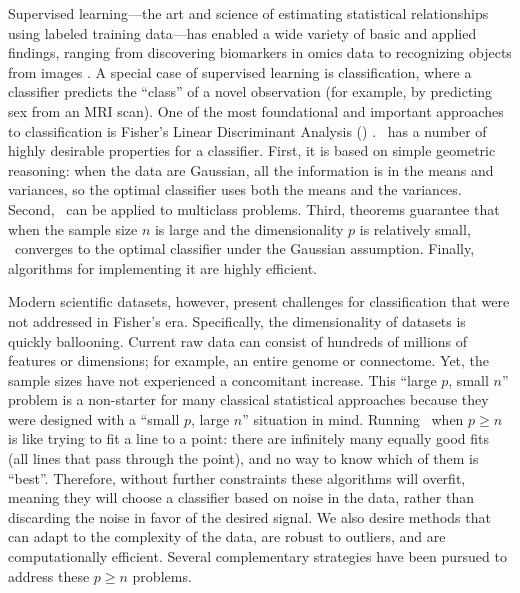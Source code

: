 \documentclass[11pt]{extarticle}
\begin{document}
Supervised learning---the art and science of estimating statistical relationships using labeled training data---has  enabled a wide variety of basic and applied findings, ranging from discovering biomarkers in omics data \cite{Vogelstein2014a} to  recognizing objects from images \cite{Krizhevsky2012}.
A special case of supervised learning is classification, where a classifier predicts the ``class'' of a novel observation (for example, by predicting sex from an MRI scan). One of the most foundational and important approaches to classification is Fisher's Linear Discriminant Analysis (\Lda) \cite{Fisher1925a}.
\Lda~has a number of highly desirable properties for a  classifier.
First, it is based on  simple geometric reasoning: when the data are Gaussian, all the information is in the means and variances, so the optimal classifier uses both the means and the variances.
Second,  \Lda~can be applied to multiclass problems.
Third, theorems guarantee that when the sample size $n$ is large and the dimensionality $p$ is relatively small, \Lda~converges to the optimal classifier under the Gaussian assumption.
Finally,  algorithms for implementing it are highly efficient.


Modern scientific datasets, however, present challenges for classification that were not addressed in Fisher's era.
Specifically, the dimensionality of datasets is quickly ballooning.
Current raw data can consist of hundreds of millions  of features or dimensions; for example, an entire genome or connectome.  Yet, the sample sizes have not experienced a concomitant increase.
This ``large $p$, small $n$'' problem is a non-starter
for many classical statistical approaches because they were designed with a ``small $p$, large $n$'' situation in mind.
Running \Lda~when $p \ge n$  is like trying to fit a line to a point: there are infinitely many equally good fits (all lines that pass through the point), and no way to know which of them is ``best''.
Therefore, without further constraints these algorithms will overfit, meaning they will choose a classifier based on noise in the data, rather than discarding the noise in favor of the desired signal.
We also desire methods that  can adapt to the complexity of the data,  are robust to outliers, and are computationally efficient.
% 
Several complementary strategies have been pursued to address these $p \ge n$ problems.
\end{document}
